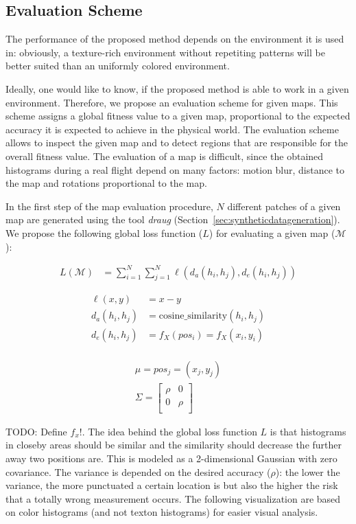 \subsection{Evaluation Scheme}
\label{sec:evaluationscheme}

The performance of the proposed method depends
on the environment it is used in: obviously, a texture-rich environment without repetiting patterns will be better suited than an uniformly colored environment. 

Ideally, one would like to know, if the proposed method is able to work in a given environment. Therefore, we propose an evaluation scheme for given
maps. This scheme assigns a global fitness value to a given map,
proportional to the expected accuracy it is expected to achieve in the physical
world. The evaluation scheme allows to inspect the given map and to detect
regions that are responsible for the overall fitness value. The evaluation of a map is
difficult, since the obtained histograms during a real flight depend
on many factors: motion blur, distance to the map and rotations
proportional to the map.

In the first step of the map evaluation procedure, $N$ different
patches of a given map are generated using the tool \emph{draug}
(Section~\ref{sec:syntheticdatageneration}). We propose the following global loss function
($L$) for evaluating a given map ($\mathcal{M}$):

\begin{align}
  L(\mathcal{M}) &= \sum_{i = 1}^{N} \sum_{j = 1}^{N} \ell(d_a(h_i, h_j), d_e(h_i, h_j))
\end{align}

\begin{align}
  \ell(x, y) &= x - y\\
  d_a(h_i, h_j) &= \text{cosine\_similarity}(h_i, h_j)\\
  d_e(h_i, h_j) &= f_X(pos_i) = f_X(x_i, y_i)\\
\end{align}

\begin{align}
\mu = pos_j = (x_j, y_j)\\
\Sigma =
  \begin{bmatrix}
    \rho & 0\\
    0 & \rho\\
  \end{bmatrix}
\end{align}

TODO: Define $f_x$!. The idea behind the global loss function $L$ is that histograms in closeby areas
should be similar and the similarity should decrease the further away
two positions are. This is modeled as a 2-dimensional Gaussian with zero
covariance. The variance is depended on the
desired accuracy ($\rho$): the lower the variance, the more punctuated
a certain location is but also the higher the risk that a totally
wrong measurement occurs. The following visualization are based on
color histograms (and not texton histograms) for easier visual
analysis.
